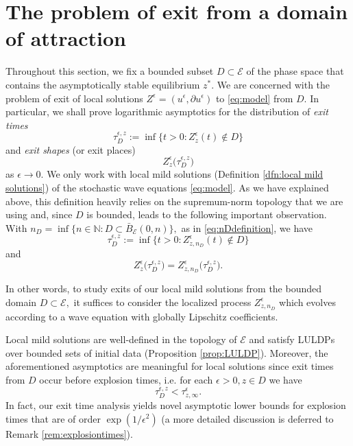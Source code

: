 \documentclass[10pt, reqno]{amsart}
\newcommand{\N}{\mathbb{N}}
\newcommand{\e}{\mathcal{E}}
\theoremstyle{definition}
\numberwithin{lem}{section}
\numberwithin{cor}{section}
\numberwithin{prop}{section}
\numberwithin{thm}{section}
\numberwithin{dfn}{section}
\begin{document}
 \section{The problem of exit from a domain of attraction}\label{Sec:Metastability} Throughout this section, we fix  a bounded subset $D\subset\e$ of the phase space that contains the asymptotically stable equilibrium $z^*.$ We are concerned with the problem of exit of local solutions $Z^{\epsilon}=(u^\epsilon, \partial u^\epsilon)$ to \eqref{eq:model} from $D.$  In particular, we shall prove logarithmic asymptotics for the distribution of \textit{exit times} 
\begin{equation}\label{eq:exittimes}
     \tau_D^{\epsilon, z}:=\inf\big\{ t>0: Z^\epsilon_z(t)\notin D     \big\}
 \end{equation}
 and \textit{exit shapes} (or exit places) 
 \begin{equation}\label{eq:exitshape}
     Z_z^\epsilon\big( \tau_D^{\epsilon, z}  \big)
 \end{equation}
 as $\epsilon\to 0.$ We only work with local mild solutions (Definition \ref{dfn:local mild solutions}) of the stochastic wave equations \eqref{eq:model}. As we have  explained above, this definition heavily relies on the supremum-norm topology that we are using and, since $D$ is bounded, leads to the following important observation.  With $n_D=\inf\{n\in\N: D\subset\bar{B}_{\e}(0,n)\},$ as in \eqref{eq:nDdefinition}, we have
 \begin{equation*}
     \tau_D^{\epsilon, z}:=\inf\big\{ t>0: Z^\epsilon_{z, n_D}(t)\notin D     \big\}
 \end{equation*}
 and
\begin{equation*}
     Z_{z}^\epsilon\big( \tau_D^{\epsilon, z}  \big)= Z_{z, n_D}^\epsilon\big( \tau_D^{\epsilon, z}  \big).
 \end{equation*}
 
 In other words, to study exits of our local mild solutions from the bounded domain $D\subset\e,$  it suffices to consider the localized process $Z_{z, n_D}^\epsilon$ which evolves according to a wave equation with globally Lipschitz coefficients.


 
 
 
 
 
 
 
 
 
 Local mild solutions are well-defined in the topology of $\e$  and satisfy LULDPs over bounded sets of initial data (Proposition \ref{prop:LULDP}). Moreover, the aforementioned asymptotics are meaningful for local solutions since exit times from $D$ occur before explosion times, i.e. for each $\epsilon>0, z\in D$ we have
 $$ \tau_D^{\epsilon, z}<\tau^\epsilon_{z,\infty}.$$
 In fact, our exit time analysis yields novel asymptotic lower bounds for explosion times that are of order $\exp(1/\epsilon^2)$ (a more detailed discussion is deferred to Remark \ref{rem:explosiontimes}). 
 
\end{document}
